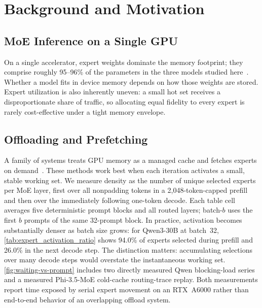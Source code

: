 \section{Background and Motivation}

\subsection{MoE Inference on a Single GPU}
On a single accelerator, expert weights dominate the memory footprint; they comprise roughly 95--96\% of the parameters in the three models studied here~\cite{qwen3technicalreport,qwen3nextmodelcard,abdin2024phi3}. Whether a model fits in device memory depends on how those weights are stored. Expert utilization is also inherently uneven: a small hot set receives a disproportionate share of traffic, so allocating equal fidelity to every expert is rarely cost-effective under a tight memory envelope.

\subsection{Offloading and Prefetching}
\label{sec:background-offload}
A family of systems treats GPU memory as a managed cache and fetches experts on demand~\cite{li2023adaptive,yi2023edgemoe,xue2024moe,eliseev2023fast,hwang2024pre,zhong2024adapmoe,tang2024hobbit,song2024promoe,kong2024swapmoe,shen2025expertflow}. These methods work best when each iteration activates a small, stable working set. We measure density as the number of unique selected experts per MoE layer, first over all nonpadding tokens in a 2,048-token-capped prefill and then over the immediately following one-token decode. Each table cell averages five deterministic prompt blocks and all routed layers; batch-$b$ uses the first $b$ prompts of the same 32-prompt block. In practice, activation becomes substantially denser as batch size grows: for Qwen3-30B at batch~32, \autoref{tab:expert_activation_ratio} shows 94.0\% of experts selected during prefill and 26.0\% in the next decode step. The distinction matters: accumulating selections over many decode steps would overstate the instantaneous working set. \autoref{fig:waiting-vs-prompt} includes two directly measured Qwen blocking-load series and a measured Phi-3.5-MoE cold-cache routing-trace replay. Both measurements report time exposed by serial expert movement on an RTX~A6000 rather than end-to-end behavior of an overlapping offload system.

